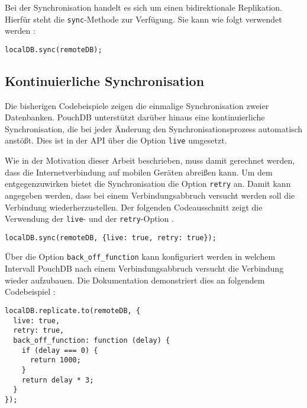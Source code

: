 Bei der Synchronisation handelt es sich um einen bidirektionale Replikation. Hierfür steht die \texttt{sync}-Methode zur Verfügung. Sie kann wie folgt verwendet werden \cite{pouch:replication}:
\begin{codebox}
\begin{lstlisting}[style=typescript]
localDB.sync(remoteDB);
\end{lstlisting}
\end{codebox}

\subsection*{Kontinuierliche Synchronisation}
Die bisherigen Codebeispiele zeigen die einmalige Synchronisation zweier Datenbanken. PouchDB unterstützt darüber hinaus eine kontinuierliche Synchronisation, die bei jeder Änderung den Synchronisationsprozess automatisch anstößt. Dies ist in der API über die Option \texttt{live} umgesetzt.

Wie in der Motivation dieser Arbeit beschrieben, muss damit gerechnet werden, dass die Internetverbindung auf mobilen Geräten abreißen kann. Um dem entgegenzuwirken bietet die Synchronisation die Option \texttt{retry} an. Damit kann angegeben werden, dass bei einem Verbindungsabbruch versucht werden soll die Verbindung wiederherzustellen. Der folgenden Codeausschnitt zeigt die Verwendung der \texttt{live}- und der \texttt{retry}-Option \cite{pouch:replication}.
\begin{codebox}
\begin{lstlisting}[style=typescript]
localDB.sync(remoteDB, {live: true, retry: true});
\end{lstlisting}
\end{codebox}

Über die Option \texttt{back\_off\_function} kann konfiguriert werden in welchem Intervall PouchDB nach einem Verbindungsabbruch versucht die Verbindung wieder aufzubauen. Die Dokumentation demonstriert dies an folgendem Codebeispiel \cite{pouch:api}:

\begin{codebox}
\begin{lstlisting}[style=typescript]
localDB.replicate.to(remoteDB, {
  live: true,
  retry: true,
  back_off_function: function (delay) {
    if (delay === 0) {
      return 1000;
    }
    return delay * 3;
  }
});
\end{lstlisting}
\end{codebox}

